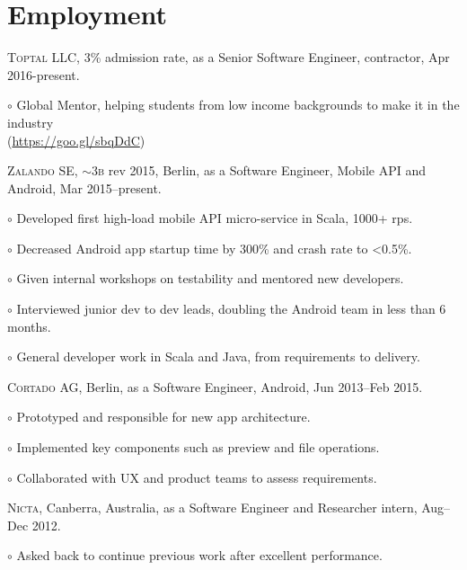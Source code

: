 \documentclass[letterpaper]{article}
\renewenvironment{itemize}{
  \begin{list}{}{
    \setlength{\leftmargin}{1.5em}
  }
}{
  \end{list}
}
\newenvironment{no-indent-itemize}{
  \begin{list}{}{
    \setlength{\leftmargin}{0em}
  }
}{
  \end{list}
}
\def\tilde{$\scriptstyle\sim$}
\def\bullet{$\circ$\xspace}
\begin{document}
\section*{Employment}
\begin{no-indent-itemize}
  \item \textsc{Toptal LLC}, 3\% admission rate, as a Senior Software Engineer, contractor, Apr 2016-present.
  \begin{itemize}
    \item\bullet Global Mentor, helping students from low income backgrounds to make it in the industry \\  
    \phantom{\bullet }(\href{https://goo.gl/sbqDdC}{https://goo.gl/sbqDdC})
  \end{itemize}
  \item \textsc{Zalando SE}, \tilde 3\textsc{b} rev 2015, Berlin, as a Software Engineer, 
         Mobile API and Android, Mar 2015--present. 
  \begin{itemize}
    \item\bullet Developed first high-load mobile API micro-service in Scala, 1000+ rps.
	\item\bullet Decreased Android app startup time by 300\% and crash rate to <0.5\%.
	\item\bullet Given internal workshops on testability and mentored new developers.
	\item\bullet Interviewed junior dev to dev leads, doubling the Android team in less than 6 months.	
	\item\bullet General developer work in Scala and Java, from requirements to delivery.
  \end{itemize}
  \item \textsc{Cortado AG}, Berlin, as a Software Engineer, Android, Jun 2013--Feb 2015.
  \begin{itemize}
    \item\bullet Prototyped and responsible for new app architecture.
    \item\bullet Implemented key components such as preview and file operations.
    \item\bullet Collaborated with UX and product teams to assess requirements.
  \end{itemize}
  \item \textsc{Nicta}, Canberra, Australia, as a Software Engineer and Researcher intern, Aug--Dec 2012. 
  \begin{itemize}
	\item\bullet Asked back to continue previous work after excellent performance.

\end{itemize}
\end{no-indent-itemize}
\end{document}
